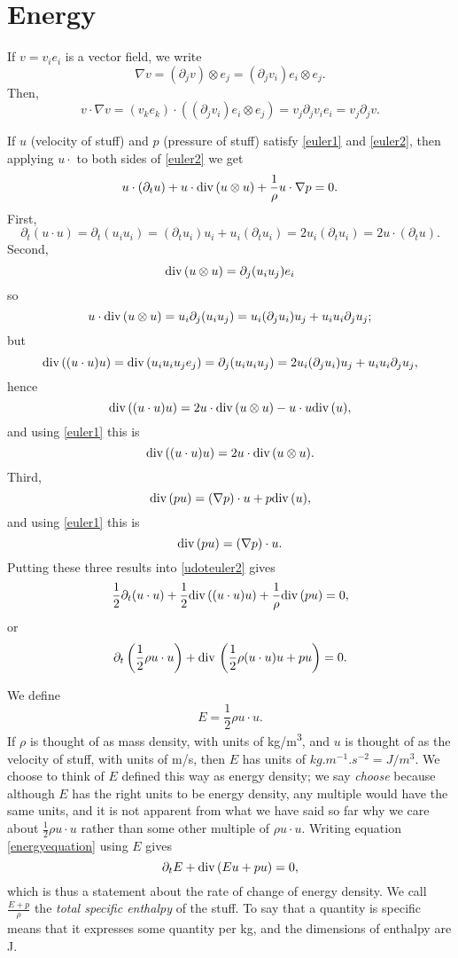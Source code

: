 \documentclass{article}
\renewcommand{\div}{\ensuremath\mathrm{div}\,}
\theoremstyle{definition}
\begin{document}
\section{Energy}
If $v=v_i e_i$ is a vector field,
we write
\[
\nabla v = (\partial_j v) \otimes e_j = (\partial_j v_i) e_i \otimes e_j.
\]
Then,
\[
v\cdot \nabla v = (v_k e_k) \cdot ( (\partial_j v_i) e_i \otimes e_j ) = v_j \partial_j v_i e_i = v_j\partial_j v.
\]


If $u$ (velocity of stuff) and $p$ (pressure of stuff) satisfy \eqref{euler1} and \eqref{euler2}, then
applying $u \cdot$ to both sides of \eqref{euler2} we get
\begin{equation}
u \cdot (\partial_t u ) + u \cdot  \div(u \otimes u ) + \frac{1}{\rho} u \cdot  \nabla p=0.
\label{udoteuler2}
\end{equation}
First,
\[
\partial_t (u \cdot u) = \partial_t (u_i u_i) = (\partial_t u_i) u_i + u_i (\partial_t u_i) = 2u_i (\partial_t u_i)= 
2 u \cdot (\partial_tu).
\]
Second,
\[
\div(u \otimes u) = \partial_j(u_iu_j)e_i
\]
so
\[
u \cdot \div(u \otimes u) = u_i \partial_j(u_i u_j) = u_i(\partial_j u_i)u_j + u_i u_i \partial_ju_j;
\]
but
\[
\div((u \cdot u) u) =  \div(u_i u_i u_j e_j) = \partial_j (u_i u_i u_j) = 2u_i(\partial_j u_i) u_j + u_i u_i \partial_j u_j,
\]
hence
\[
\div((u\cdot u)u) = 2 u\cdot \div(u \otimes u) - u\cdot u \div(u),
\]
and using \eqref{euler1} this is
\[
\div((u \cdot u)u) = 2 u\cdot \div(u \otimes u).
\]
Third,
\[
\div(pu) = (\nabla p) \cdot u + p \div (u),
\]
and using \eqref{euler1} this is
\[
\div(pu) = (\nabla p) \cdot u.
\]
Putting these three results  into \eqref{udoteuler2} gives
\[
\frac{1}{2} \partial_t(u\cdot u) + \frac{1}{2} \div((u\cdot u)u) + \frac{1}{\rho} \div(pu) =0,
\]
or
\begin{equation}
\partial_t \left( \frac{1}{2}\rho u\cdot u \right) + \div\left(\frac{1}{2}\rho (u\cdot u)u + pu \right)=0.
\label{energyequation}
\end{equation}

We define
\[
E=\frac{1}{2}\rho u\cdot u.
\]
If $\rho$ is thought of as mass density, with units of \si{kg/m^3}, and $u$ is thought of as the velocity of stuff, with units of \si{m/s},
then $E$ has units of 
$\si{kg.m^{-1}.s^{-2}}=\si{J/m^3}$. We choose to think of  $E$ defined this way as energy density; we say {\em choose} because although $E$ has the right units to be energy density,
any multiple would have the same units, and it is not apparent from what we have said so far why we care about $\frac{1}{2}\rho u\cdot u$ rather than some other multiple of 
$\rho u\cdot u$.
Writing equation \eqref{energyequation} using $E$ gives
\[
\partial_t E + \div(E u  + pu) = 0,
\]
which is thus a statement about the rate of change of  energy density.
We call $\frac{E+p}{\rho}$ the {\em total specific enthalpy} of the stuff. To say that a quantity  is specific means that it expresses some quantity per \si{kg}, and the dimensions of
enthalpy are \si{J}.
\end{document}
